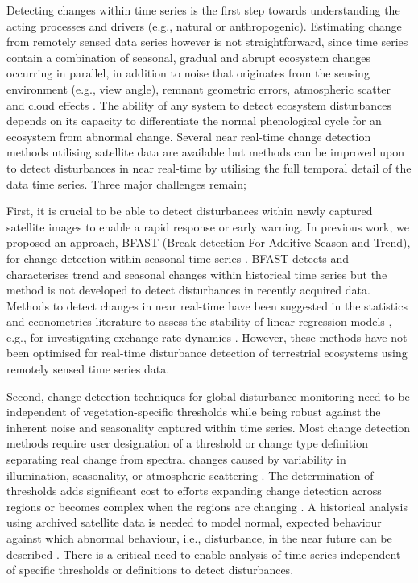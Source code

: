 \documentclass[authoryear,preprint,review,10pt]{elsarticle}
\begin{document}
Detecting changes within time series is the first step towards understanding the acting processes and drivers (e.g., natural or anthropogenic). Estimating change from remotely sensed data series however is not straightforward, since time series contain a combination of seasonal, gradual and abrupt ecosystem changes occurring in parallel, in addition to noise that originates from the sensing environment (e.g., view angle), remnant geometric errors, atmospheric scatter and cloud effects \citep{Beurs2005a, Roy2002, Wolfe1998}. The ability of any system to detect ecosystem disturbances depends on its capacity to differentiate the normal phenological cycle for an ecosystem from abnormal change. Several near real-time change detection methods utilising satellite data are available \citep{Jiang:2010ko, Verdin:2005by, White2006} but methods can be improved upon to detect disturbances in near real-time by utilising the full temporal detail of the data time series. Three major challenges remain;

First, it is crucial to be able to detect disturbances within newly captured satellite images to enable a rapid response or early warning. In previous work, we proposed an approach,  BFAST (Break detection For Additive Season and Trend), for change detection within seasonal time series \citep{deJong:wo, Verbesselt2009a,Verbesselt:2010wo}.
BFAST detects and characterises trend and seasonal changes within historical time series but the method is not developed to detect disturbances in recently acquired data. Methods to detect changes in near real-time have been suggested in the statistics and econometrics literature to assess the stability of linear regression models \citep{Chu1996}, e.g., for investigating exchange rate dynamics \citep{Zeileis:2010tt}. However, these methods have not been optimised for real-time disturbance detection of terrestrial ecosystems using remotely sensed time series data.

Second, change detection techniques for global disturbance monitoring need to be independent of vegetation-specific thresholds while being robust against the inherent noise and seasonality captured within time series.
Most change detection methods require user designation of a threshold or change type definition separating real change from spectral changes caused by variability in illumination, seasonality, or atmospheric scattering \citep{Lu2004, Potter2003, Hayes2007}. The determination of thresholds adds significant cost to efforts expanding change detection across regions or becomes complex when the regions are changing  \citep{White2006}. A historical analysis using archived satellite data is needed to model normal, expected behaviour against which abnormal behaviour, i.e., disturbance, in the near future can be described \citep{Hargrove2009}. There is a critical need to enable analysis of time series independent of specific thresholds or definitions to detect disturbances.
\end{document}
